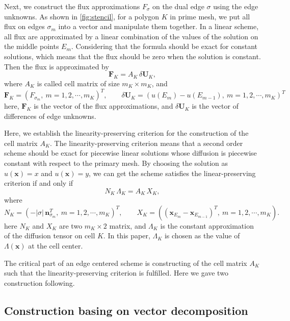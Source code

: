 \documentclass[times,review,preprint,authoryear]{elsarticle}
\newcommand{\bx}{\mathbf{x}}
\newcommand{\bn}{\mathbf{n}}
\begin{document}
Next, we construct the flux approximations $F_{\sigma}$ on the dual edge $\sigma$ using the edge unknowns.
As shown in \cref{fig:stencil}, for a polygon $K$ in prime mesh, we put all flux on edges $\sigma_m$ into a vector and manipulate them together. In a linear scheme, all flux are approximated by a linear combination of the values of the solution on the middle points $E_m$. Considering that the formula should be exact for constant solutions, which means that the flux should be zero when the solution is constant. Then the flux is approximated by
\begin{equation}\label{eq:fluxapp}
\mathbf{F}_{K} = A_K \, \delta \mathbf{U}_{K},
\end{equation}
where $A_K$ is called cell matrix of size $m_K \times m_K$, and 
\begin{equation*}
\mathbf{F}_{K} = (F_{\sigma_m}, \ m = 1,2,\cdots,m_K)^T, \qquad \delta \mathbf{U}_{K} = (u(E_{m}) - u(E_{m-1}), \ m = 1,2,\cdots,m_K)^T
\end{equation*}
here, $\mathbf{F}_{K}$ is the vector of the flux approximations, and  $\delta \mathbf{U}_{K}$ is the vector of differences of edge unknowns.

Here, we establish the linearity-preserving criterion for the construction of the cell matrix $A_K$. The  linearity-preserving criterion means that a second order scheme should be exact for piecewise linear solutions whose diffusion is piecewise constant with respect to the primary mesh. By choosing the solution as $u(\bx) = x$ and $u(\bx) = y$, we can get the scheme satisfies the linear-preserving criterion if and only if
\begin{equation}\label{eq:lpmat}
N_{K} \, \Lambda_{K} = A_{K} \, X_{K},
\end{equation}
where
\begin{equation}\label{eq:defnx}
N_K = (- |\sigma| \, \bn_{\sigma_{m}}^T, \ m = 1,2,\cdots,m_K)^T, \qquad X_K = ((\bx_{E_{m}} - \bx_{E_{m-1}})^T, \ m = 1,2,\cdots,m_K).
\end{equation}
here $N_K$ and $X_K$ are two $m_K \times 2$ matrix, and $\Lambda_K$ is the constant approximation of the diffusion tensor on cell $K$. In this paper, $\Lambda_K$ is chosen as the value of $\Lambda(\bx)$ at the cell center.

The critical part of an edge centered scheme is constructing of the cell matrix $A_{K}$ such that the linearity-preserving criterion is fulfilled. Here we gave two construction following.

\subsection{Construction basing on vector decomposition}
\end{document}
